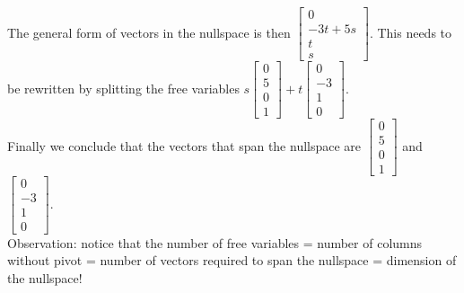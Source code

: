 \begin{enumerate}
{	The general form of vectors in the nullspace is then $\begin{bmatrix} 0 \\ -3t + 5s \\ t \\ s \end{bmatrix}$. This needs to be rewritten by splitting the free variables $s\begin{bmatrix} 0 \\ 5 \\ 0 \\ 1 \end{bmatrix} + t\begin{bmatrix} 0 \\ -3 \\ 1 \\ 0\end{bmatrix}$. \\

	Finally we conclude that the vectors that span the nullspace are $\begin{bmatrix} 0 \\ 5 \\ 0 \\ 1 \end{bmatrix}$ and $\begin{bmatrix} 0 \\ -3 \\ 1 \\ 0 \end{bmatrix}$. \\

	Observation: notice that the number of free variables = number of columns without pivot = number of vectors required to span the nullspace = dimension of the nullspace!
}




\end{enumerate}